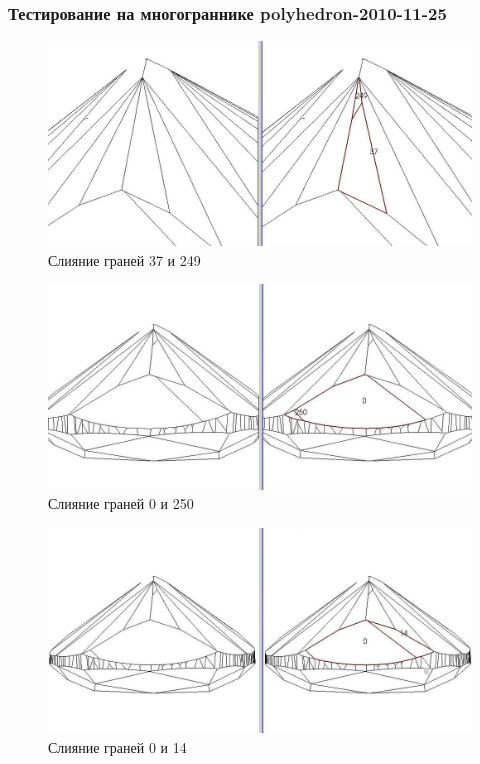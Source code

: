 \documentclass[a4paper,12pt, titlepage]{article}
\begin{document}
\subsubsection{Тестирование на многограннике polyhedron-2010-11-25}
\begin{flushleft}
  \begin{figure}[p]
    \includegraphics[width=15cm]{polyhedron-2010-11-25/join1.jpeg}
    \caption{Слияние граней 37 и 249}\label{join1}
  \end{figure}
\end{flushleft}
\begin{flushleft}
  \begin{figure}[p]
    \includegraphics[width=15cm]{polyhedron-2010-11-25/join2.jpeg}
    \caption{Слияние граней 0 и 250}\label{join2}
  \end{figure}
\end{flushleft}
\begin{flushleft}
  \begin{figure}[p]
    \includegraphics[width=15cm]{polyhedron-2010-11-25/join3.jpeg}
    \caption{Слияние граней 0 и 14}\label{join3}
  \end{figure}
\end{flushleft}
\end{document}
